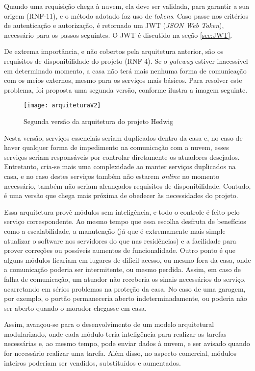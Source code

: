 Quando uma requisição chega à nuvem, ela deve ser validada, para garantir a sua origem (RNF-11), e o método adotado faz uso de \emph{tokens}.  Caso passe nos critérios de autenticação e autorização, é retornado um JWT (\textit{JSON Web Token}), necessário para os passos seguintes. O JWT é discutido na seção \ref{sec:JWT}. %

De extrema importância, e não cobertos pela arquitetura anterior, são os requisitos de disponibilidade do projeto (RNF-4). Se o \textit{gateway} estiver inacessível em determinado momento, a casa não terá mais nenhuma forma de comunicação com os meios externos, mesmo para os serviços mais básicos. Para resolver este problema, foi proposta uma segunda versão, conforme ilustra a imagem seguinte.

\begin{figure}[H]
	\centering
	\caption{Segunda versão da arquitetura do projeto Hedwig}
  \texttt{[image: arquiteturaV2]}
\label{fig:arquiteturaV2}
\end{figure}

Nesta versão, serviços essenciais seriam duplicados dentro da casa e, no caso de haver qualquer forma de impedimento na comunicação com a nuvem, esses serviços seriam responsáveis por controlar diretamente os atuadores desejados. Entretanto, cria-se mais uma complexidade ao manter serviços duplicados na casa, e no caso destes serviços também não estarem \emph{online} no momento necessário, também não seriam alcançados requisitos de disponibilidade. Contudo, é uma versão que chega mais próxima de obedecer às necessidades do projeto.

Essa arquitetura provê módulos sem inteligência, e todo o controle é feito pelo serviço correspondente. Ao mesmo tempo que essa escolha desfruta de benefícios como a escalabilidade, a manutenção (já que é extremamente mais simple atualizar o software nos servidores do que nas residências) e a facilidade para prover correções ou possíveis aumentos de funcionalidade. Outro ponto é que alguns módulos ficariam em lugares de difícil acesso, ou mesmo fora da casa, onde a comunicação poderia ser intermitente, ou mesmo perdida. Assim, em caso de falha de comunicação, um atuador não receberia os sinais necessários do serviço, acarretando em sérios problemas na proteção da casa. No caso de uma garagem, por exemplo, o portão permaneceria aberto indeterminadamente, ou poderia não ser aberto quando o morador chegasse em casa.

Assim, avançou-se para o desenvolvimento de um modelo arquitetural modularizado, onde cada módulo teria inteligência para realizar as tarefas necessárias e, ao mesmo tempo, pode enviar dados à nuvem, e ser avisado quando for necessário realizar uma tarefa. Além disso, no aspecto comercial, módulos inteiros poderiam ser vendidos, substituídos e aumentados.

